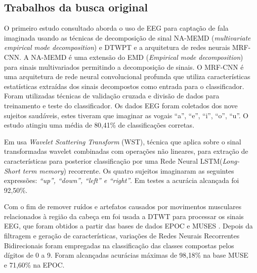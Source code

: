 		\subsection{Trabalhos da busca original}

			\par O primeiro estudo consultado \cite{ParkHyeong-jun2023Mcoi} aborda o uso de EEG para captação de fala imaginada usando as técnicas de decomposição de sinal NA-MEMD (\textit{multivariate empirical mode decomposition}) e \ac{DTWPT} e a arquitetura de redes neurais MRF-CNN. A NA-MEMD é uma extensão do EMD (\textit{Empirical mode decomposition}) para sinais multivariados permitindo a decomposição de sinais. O MRF-CNN é uma arquitetura de rede neural convolucional profunda que utiliza características estatísticas extraídas dos sinais decompostos como entrada para o classificador. Foram utilizadas técnicas de validação cruzada e divisão de dados para treinamento e teste do classificador. Os dados EEG foram coletados dos nove sujeitos saudáveis, estes tiveram que imaginar as vogais ``a'', ``e'', ``i'', ``o'', ``u''. O estudo atingiu uma média de 80,41\% de classificações corretas.
			
			\par Em  usa \textit{Wavelet Scattering Transform} (WST), técnica que aplica sobre o sinal transformadas wavelet combinadas com operações não lineares, para extração de características para posterior classificação por uma Rede Neural LSTM(\textit{Long-Short term memory}) recorrente. Os quatro sujeitos imaginaram as seguintes expressões: \textit{``up'', ``down'', ``left'' e ``right''}. Em testes a acurácia alcançada foi 92,50\%.
			
			\par Com o fim de remover ruídos e artefatos causados por movimentos musculares relacionados à região da cabeça em  foi usada a \ac{DTWT} para processar os sinais EEG, que foram obtidos a partir das bases de dados EPOC e MUSES \cite{mindbigdata}. Depois da filtragem e geração de características, variações de Redes Neurais Recorrentes Bidirecionais foram empregadas na classificação das classes compostas pelos dígitos de 0 a 9. Foram alcançadas acurácias máximas de 98,18\% na base MUSE e 71,60\% na EPOC.
			

